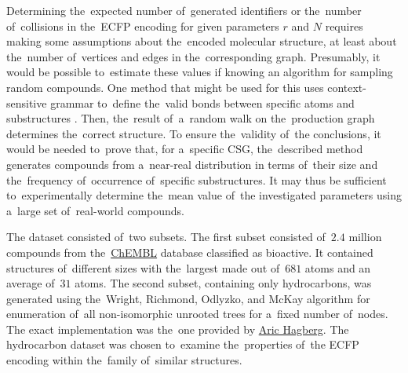 Determining the~expected number of~generated identifiers or the~number of~collisions in the~ECFP encoding for given parameters \( r \) and \( N \) requires making some assumptions about the~encoded molecular structure, at least about the~number of~vertices and edges in the~corresponding graph. Presumably, it would be possible to~estimate these values if knowing an algorithm for sampling random compounds. One method that might be used for this uses context-sensitive grammar to~define the~valid bonds between specific atoms and substructures \cite{sun2024grammars}. Then, the~result of~a~random walk on the~production graph determines the~correct structure. To ensure the~validity of~the conclusions, it would be needed to~prove that, for a~specific CSG, the~described method generates compounds from a~near-real distribution in terms of~their size and the~frequency of~occurrence of~specific substructures. It may thus be sufficient to~experimentally determine the~mean value of~the investigated parameters using a~large set of~real-world compounds.

The dataset consisted of~two subsets. The first subset consisted of~\( 2.4 \) million compounds from the~\href{https://www.ebi.ac.uk/chembl/explore/compounds/}{ChEMBL} database classified as bioactive. It contained structures of~different sizes with the~largest made out of~\( 681 \) atoms and an average of~\( 31 \) atoms. The second subset, containing only hydrocarbons, was generated using the~Wright, Richmond, Odlyzko, and McKay algorithm for enumeration of~all non-isomorphic unrooted trees for a~fixed number of~nodes. The exact implementation was the~one provided by \href{https://gist.github.com/hagberg/7979081}{Aric Hagberg}. The hydrocarbon dataset was chosen to~examine the~properties of~the ECFP encoding within the~family of~similar structures.

